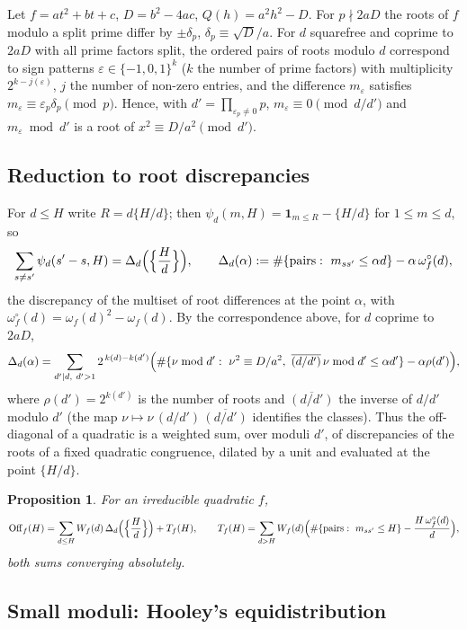 \documentclass[11pt,a4paper]{article}
\newtheorem{proposition}[theorem]{Proposition}
\newcommand{\Off}{\mathrm{Off}}
\begin{document}
Let $f=at^2+bt+c$, $D=b^2-4ac$, $Q(h)=a^2h^2-D$. For $p\nmid2aD$ the roots of $f$ modulo a split prime
differ by $\pm\delta_p$, $\delta_p\equiv\sqrt D/a$. For $d$ squarefree and coprime to $2aD$ with all
prime factors split, the ordered pairs of roots modulo $d$ correspond to sign patterns
$\varepsilon\in\{-1,0,1\}^{k}$ ($k$ the number of prime factors) with multiplicity $2^{k-j(\varepsilon)}$,
$j$ the number of non-zero entries, and the difference $m_\varepsilon$ satisfies
$m_\varepsilon\equiv\varepsilon_p\delta_p\pmod p$. Hence, with $d'=\prod_{\varepsilon_p\ne0}p$,
$m_\varepsilon\equiv0\pmod{d/d'}$ and $m_\varepsilon\bmod d'$ is a root of $x^2\equiv D/a^2\pmod{d'}$.

\subsection{Reduction to root discrepancies}

For $d\le H$ write $R=d\{H/d\}$; then $\psi_d(m,H)=\mathbf 1_{m\le R}-\{H/d\}$ for $1\le m\le d$, so
\begin{equation}\label{eq:disc}
\sum_{s\ne s'}\psi_d(s'-s,H)=\Delta_d\Bigl(\Bigl\{\frac Hd\Bigr\}\Bigr),\qquad
\Delta_d(\alpha):=\#\{\text{pairs}:\ m_{ss'}\le\alpha d\}-\alpha\,\omega^\circ_f(d),
\end{equation}
the discrepancy of the multiset of root differences at the point $\alpha$, with
$\omega^\circ_f(d)=\omega_f(d)^2-\omega_f(d)$. By the correspondence above, for $d$ coprime to $2aD$,
\[
\Delta_d(\alpha)=\sum_{d'\mid d,\ d'>1}2^{\,k(d)-k(d')}\Bigl(\#\{\nu\bmod d':\ \nu^2\equiv D/a^2,\ \overline{(d/d')}\,\nu\bmod d'\le\alpha d'\}-\alpha\rho(d')\Bigr),
\]
where $\rho(d')=2^{k(d')}$ is the number of roots and $\overline{(d/d')}$ the inverse of $d/d'$ modulo $d'$
(the map $\nu\mapsto\nu\,(d/d')\,\overline{(d/d')}$ identifies the classes). Thus the off-diagonal of a
quadratic is a weighted sum, over moduli $d'$, of discrepancies of the roots of a fixed quadratic
congruence, dilated by a unit and evaluated at the point $\{H/d\}$.

\begin{proposition}\label{prop:A1}
For an irreducible quadratic $f$,
\[
\Off_f(H)=\sum_{d\le H}W_f(d)\,\Delta_d\Bigl(\Bigl\{\frac Hd\Bigr\}\Bigr)+T_f(H),\qquad
T_f(H)=\sum_{d>H}W_f(d)\Bigl(\#\{\text{pairs}:\ m_{ss'}\le H\}-\frac{H\,\omega^\circ_f(d)}d\Bigr),
\]
both sums converging absolutely.
\end{proposition}

\subsection{Small moduli: Hooley's equidistribution}
\end{document}
